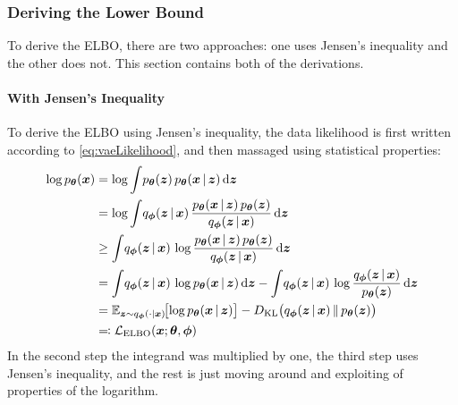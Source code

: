 			\subsubsection{Deriving the Lower Bound}
				To derive the ELBO, there are two approaches: one uses Jensen's inequality and the other does not. This section contains both of the derivations.

				\paragraph{With Jensen's Inequality}
					To derive the ELBO using Jensen's inequality, the data likelihood is first written according to \eqref{eq:vaeLikelihood}, and then massaged using statistical properties:
					\begin{align}
						\log p_{\bm{\theta}}(\bm{x})
							&= \log \int\! p_{\bm{\theta}}(\bm{z}) \, p_{\bm{\theta}}(\bm{x} \,\vert\, \bm{z}) \dd{\bm{z}} \\
							&= \log \int\! q_{\bm{\phi}}(\bm{z} \,\vert\, \bm{x}) \, \frac{p_{\bm{\theta}}(\bm{x} \,\vert\, \bm{z}) \, p_{\bm{\theta}}(\bm{z})}{q_{\bm{\phi}}(\bm{z} \,\vert\, \bm{x})} \dd{\bm{z}} \\
							&\geq \int\! q_{\bm{\phi}}(\bm{z} \,\vert\, \bm{x}) \, \log \frac{p_{\bm{\theta}}(\bm{x} \,\vert\, \bm{z}) \, p_{\bm{\theta}}(\bm{z})}{q_{\bm{\phi}}(\bm{z} \,\vert\, \bm{x})} \dd{\bm{z}} \\
							&= \int\! q_{\bm{\phi}}(\bm{z} \,\vert\, \bm{x}) \, \log p_{\bm{\theta}}(\bm{x} \,\vert\, \bm{z}) \dd{\bm{z}} - \int\! q_{\bm{\phi}}(\bm{z} \,\vert\, \bm{x}) \, \log \frac{q_{\bm{\phi}}(\bm{z} \,\vert\, \bm{x})}{p_{\bm{\theta}}(\bm{z})} \dd{\bm{z}} \\
							&= \mathbb{E}_{\bm{z} \sim q_{\bm{\phi}}(\cdot \vert \bm{x})}\!\big[\! \log p_{\bm{\theta}}(\bm{x} \,\vert\, \bm{z}) \big] - D_\mathrm{KL}\big( q_{\bm{\phi}}(\bm{z} \,\vert\, \bm{x}) \,\Vert\, p_{\bm{\theta}}(\bm{z}) \big) \\
							&\eqqcolon \mathcal{L}_\mathrm{ELBO}(\bm{x}; \bm{\theta}, \bm{\phi})
					\end{align}
					In the second step the integrand was multiplied by one, the third step uses Jensen's inequality, and the rest is just moving around and exploiting of properties of the logarithm.

